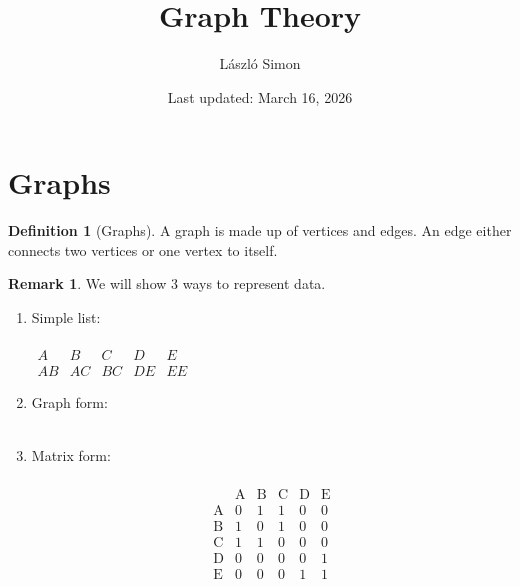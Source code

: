 \documentclass{article}
\title{Graph Theory}
\author{László Simon}
\date{Last updated: March 16, 2026}
\theoremstyle{definition}
\newtheorem{definition}{Definition}[section]
\newtheorem*{remark}{Remark}
\theoremstyle{definition}
\begin{document}
\maketitle
\tableofcontents
\newpage

\section{Graphs}
\begin{definition}[Graphs]
A graph is made up of vertices and edges. An edge either connects two vertices or one vertex to itself.
\end{definition}

\begin{remark}
We will show 3 ways to represent data.
\begin{enumerate}
\item Simple list: \\ \\
$\begin{matrix}
A & B & C & D & E\\
AB & AC & BC & DE & EE
\end{matrix}$

\item Graph form: \\ \\

\item Matrix form: \\ \\
\[
\begin{matrix}
 & \text{A} & \text{B} & \text{C} & \text{D} & \text{E} \\
\text{A} & 0 & 1 & 1 & 0 & 0\\
\text{B} & 1 & 0 & 1 & 0 & 0\\
\text{C} & 1 & 1 & 0 & 0 & 0\\
\text{D} & 0 & 0 & 0 & 0 & 1\\
\text{E} & 0 & 0 & 0 & 1 & 1
\end{matrix}
\]
\end{enumerate}
\end{remark}
\end{document}
